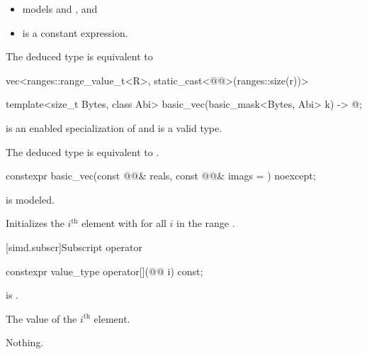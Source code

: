 \begin{itemdescr}
\pnum
\constraints
\begin{itemize}
\item {} models  and
  , and
\item {} is a constant expression.
\end{itemize}

\pnum
\remarks
The deduced type is equivalent to
\begin{codeblock}
vec<ranges::range_value_t<R>, static_cast<@@>(ranges::size(r))>
\end{codeblock}
\end{itemdescr}

\begin{itemdecl}
template<size_t Bytes, class Abi>
  basic_vec(basic_mask<Bytes, Abi> k) -> @\seebelow@;
\end{itemdecl}

\begin{itemdescr}
\pnum
\constraints
{} is an enabled specialization of  and
 is a valid type.

\pnum
\remarks
The deduced type is equivalent to .
\end{itemdescr}

\begin{itemdecl}
constexpr basic_vec(const @@& reals, const @@& imags = {}) noexcept;
\end{itemdecl}

\begin{itemdescr}
\pnum
\constraints
{} is modeled.

\pnum
\effects
Initializes the $i^\text{th}$ element with  for all $i$ in the range .
\end{itemdescr}

[simd.subscr]{Subscript operator}

\begin{itemdecl}
constexpr value_type operator[](@@ i) const;
\end{itemdecl}

\begin{itemdescr}
\pnum
\expects
{} is .

\pnum
\returns
The value of the $i^\text{th}$ element.

\pnum
\throws
Nothing.
\end{itemdescr}


